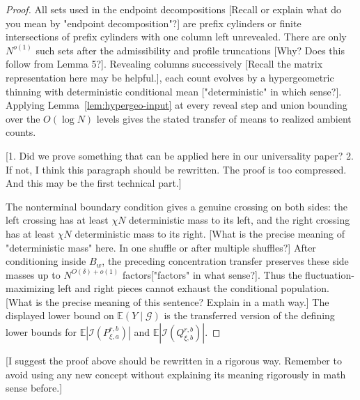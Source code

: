 \documentclass[11pt]{article}
\newcommand{\cI}{\mathcal I}
\newcommand{\E}{\mathbb E}
\newcommand{\jscomment}[1]{\textup{\textsf{\color{blue}[#1]}}}
\begin{document}
\begin{proof}
All sets used in the endpoint decompositions \jscomment{Recall or explain what do you mean by "endpoint decomposition"?} are prefix cylinders or
finite intersections of prefix cylinders with one column left unrevealed.
There are only \(N^{o(1)}\) such sets after the admissibility and
profile truncations \jscomment{Why? Does this follow from Lemma 5?}. Revealing columns successively \jscomment{Recall the matrix representation here may be helpful.}, each count evolves by
a hypergeometric thinning with deterministic conditional mean \jscomment{"deterministic" in which sense?}. Applying
Lemma~\ref{lem:hypergeo-input} at every reveal step and union bounding over
the \(O(\log N)\) levels gives the stated transfer of means to realized
ambient counts.

\jscomment{1. Did we prove something that can be applied here in our universality paper? 2. If not, I think this paragraph should be rewritten. The proof is too compressed. And this may be the first technical part.}

The nonterminal boundary condition gives a genuine crossing on both sides:
the left crossing has at least \(\chi N\) deterministic mass to its left,
and the right crossing has at least \(\chi N\) deterministic mass to its
right.
\jscomment{What is the precise meaning of "deterministic mass" here. In one shuffle or after multiple shuffles?}
After conditioning inside \(B_w\), the preceding concentration
transfer preserves these side masses up to \(N^{O(\delta)+o(1)}\) factors\jscomment{"factors" in what sense?}.
Thus the fluctuation-maximizing left and right pieces cannot exhaust the
conditional population. 
\jscomment{What is the precise meaning of this sentence? Explain in a math way.}
The displayed lower bound on \(\E(Y\mid\mathcal G)\)
is the transferred version of the defining lower bounds for
\(\E|\cI(P_{\xi,a}^{r,b})|\) and \(\E|\cI(Q_{\xi,b}^{r,b})|\).
\end{proof}

\jscomment{I suggest the proof above should be rewritten in a rigorous way. Remember to avoid using any new concept without explaining its meaning rigorously in math sense before.}
\end{document}
